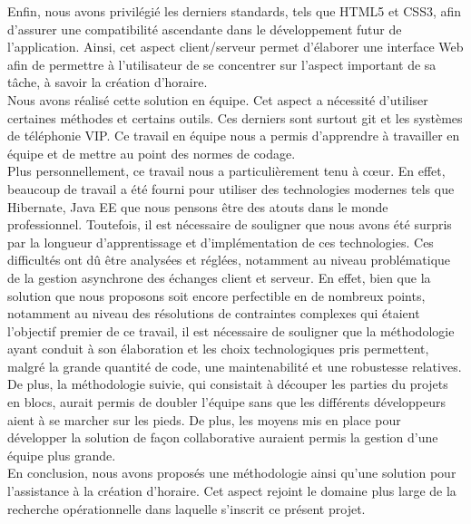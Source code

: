\newline
\indent
Enfin, nous avons privilégié les derniers standards, tels que HTML5 et CSS3, afin d'assurer une compatibilité ascendante dans le développement futur de l'application.
Ainsi, cet aspect client/serveur permet d'élaborer une interface Web afin de permettre à l'utilisateur de se concentrer sur l'aspect important de sa tâche, à savoir la création d'horaire.\\
\newline
\indent
Nous avons réalisé cette solution en équipe. Cet aspect a nécessité d'utiliser certaines méthodes et certains outils. Ces derniers sont surtout git et les systèmes de téléphonie VIP. Ce travail en équipe nous a permis d'apprendre à travailler en équipe et de mettre au point des normes de codage.\\
\newline
\indent
Plus personnellement, ce travail nous a particulièrement tenu à cœur. En effet, beaucoup de travail a été fourni pour utiliser des technologies modernes tels que Hibernate, Java EE que nous pensons être des atouts dans le monde professionnel. Toutefois, il est nécessaire de souligner que nous avons été surpris par la longueur d'apprentissage et d'implémentation de ces technologies. Ces difficultés ont dû être analysées et réglées, notamment au niveau problématique de la gestion asynchrone des échanges client et serveur.
\newline
\indent
En effet, bien que la solution que nous proposons soit encore perfectible en de nombreux points, notamment au niveau des résolutions de contraintes complexes qui étaient l'objectif premier de ce travail, il est nécessaire de souligner que la méthodologie ayant conduit à son élaboration et les choix technologiques pris permettent, malgré la grande quantité de code, une maintenabilité et une robustesse relatives.
\newline
\indent
De plus, la méthodologie suivie, qui consistait à découper les parties du projets en blocs, aurait permis de doubler l'équipe sans que les différents développeurs aient à se marcher sur les pieds. De plus, les moyens mis en place pour développer la solution de façon collaborative auraient permis la gestion d'une équipe plus grande.\\
\newline
\indent
En conclusion, nous avons proposés une méthodologie ainsi qu'une solution pour l'assistance à la création d'horaire. Cet aspect rejoint le domaine plus large de la recherche opérationnelle dans laquelle s'inscrit ce présent projet. 

